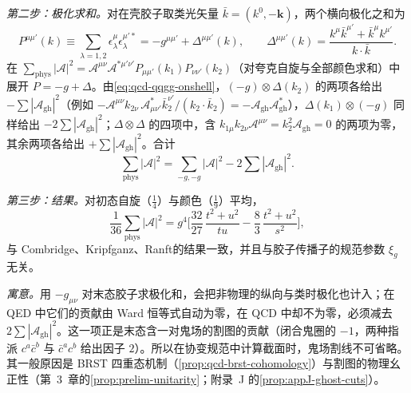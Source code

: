 \begin{example}
\emph{第二步：极化求和。}对在壳胶子取类光矢量 $\bar k=(k^0,-\mathbf k)$，两个横向极化之和为
\[
P^{\mu\mu'}(k)\equiv\sum_{\lambda=1,2}\epsilon^\mu_\lambda\epsilon^{\mu'*}_\lambda=-g^{\mu\mu'}+\Delta^{\mu\mu'}(k),\qquad \Delta^{\mu\mu'}(k)=\frac{k^\mu\bar k^{\mu'}+\bar k^\mu k^{\mu'}}{k\cdot\bar k}.
\]
在 $\sum_{\mathrm{phys}}|\mathcal A|^2=\mathcal A^{\mu\nu}\mathcal A^{*\mu'\nu'}P_{\mu\mu'}(k_1)P_{\nu\nu'}(k_2)$（对夸克自旋与全部颜色求和）中展开 $P=-g+\Delta$。由\cref{eq:qcd-qqgg-onshell}，$(-g)\otimes\Delta(k_2)$ 的两项各给出 $-\sum|\mathcal A_{\mathrm{gh}}|^2$（例如 $-\mathcal A^{\mu\nu}k_{2\nu}\,\mathcal A^*_{\mu\nu'}\bar k_2^{\nu'}/(k_2\cdot\bar k_2)=-\mathcal A_{\mathrm{gh}}\mathcal A^*_{\mathrm{gh}}$），$\Delta(k_1)\otimes(-g)$ 同样给出 $-2\sum|\mathcal A_{\mathrm{gh}}|^2$；$\Delta\otimes\Delta$ 的四项中，含 $k_{1\mu}k_{2\nu}\mathcal A^{\mu\nu}=k_2^2\mathcal A_{\mathrm{gh}}=0$ 的两项为零，其余两项各给出 $+\sum|\mathcal A_{\mathrm{gh}}|^2$。合计
\begin{equation}\label{eq:qcd-qqgg-ghost}
\sum_{\mathrm{phys}}|\mathcal A|^2=\sum_{-g,-g}|\mathcal A|^2-2\sum|\mathcal A_{\mathrm{gh}}|^2 .
\end{equation}

\emph{第三步：结果。}对初态自旋（$\frac14$）与颜色（$\frac19$）平均，%
\begin{equation}\label{eq:qcd-qqgg-ckr}
\frac1{36}\sum_{\mathrm{phys}}|\mathcal A|^2=g^4\Big[\frac{32}{27}\,\frac{t^2+u^2}{tu}-\frac83\,\frac{t^2+u^2}{s^2}\Big],
\end{equation}
与 Combridge、Kripfganz、Ranft\cite{CombridgeKripfganzRanft1977}的结果一致，并且与胶子传播子的规范参数 $\xi_g$ 无关。%

\emph{寓意。}用 $-g_{\mu\nu}$ 对末态胶子求极化和，会把非物理的纵向与类时极化也计入；在 QED 中它们的贡献由 Ward 恒等式自动为零，在 QCD 中却不为零，必须减去 $2\sum|\mathcal A_{\mathrm{gh}}|^2$。这一项正是末态含一对鬼场的割图的贡献（闭合鬼圈的 $-1$，两种指派 $c^a\bar c^b$ 与 $\bar c^ac^b$ 给出因子 $2$）。所以在协变规范中计算截面时，鬼场割线不可省略。其一般原因是 BRST 四重态机制（\cref{prop:qcd-brst-cohomology}）与割图的物理幺正性（第~3~章的\cref{prop:prelim-unitarity}；附录~J 的\cref{prop:appJ-ghost-cuts}）。
\end{example}

